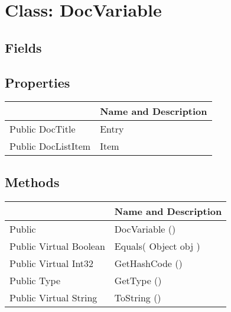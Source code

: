\documentclass[11pt, oneside, a4paper]{book}
\begin{document}
\hypertarget{SoftwareEngineeringTools.{}Documentation.{}DocVariable}{}
\section{Class: DocVariable}

\subsection{Fields}

\subsection{Properties}
\begin{center}
\begin{tabular}{| p{3cm} | p{12cm} | }
\hline
\textbf{ } & \textbf{ Name and Description}\\
\hline
 Public  DocTitle &  Entry\hypertarget{SoftwareEngineeringTools.{}Documentation.{}DocVariable.{}Entry}{}\\
\hline
 Public  DocListItem &  Item\hypertarget{SoftwareEngineeringTools.{}Documentation.{}DocVariable.{}Item}{}\\
\hline
\end{tabular}
\end{center}

\subsection{Methods}
\begin{center}
\begin{tabular}{| p{3cm} | p{12cm} | }
\hline
\textbf{ } & \textbf{ Name and Description}\\
\hline
 Public  &  DocVariable ()\hypertarget{SoftwareEngineeringTools.{}Documentation.{}DocVariable.{}DocVariable}{}\\
\hline
 Public  Virtual  Boolean &  Equals(\hypertarget{SoftwareEngineeringTools.{}Documentation.{}DocVariable.{}Equals\_Object}{} Object  obj  )\\
\hline
 Public  Virtual  Int32 &  GetHashCode ()\hypertarget{SoftwareEngineeringTools.{}Documentation.{}DocVariable.{}GetHashCode}{}\\
\hline
 Public  Type &  GetType ()\hypertarget{SoftwareEngineeringTools.{}Documentation.{}DocVariable.{}GetType}{}\\
\hline
 Public  Virtual  String &  ToString ()\hypertarget{SoftwareEngineeringTools.{}Documentation.{}DocVariable.{}ToString}{}\\
\hline
\end{tabular}
\end{center}
 
\end{document}
